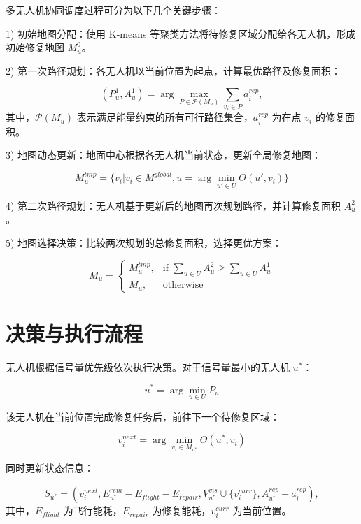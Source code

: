 \documentclass[AutoFakeBold]{LZUThesis}
\begin{document}
多无人机协同调度过程可分为以下几个关键步骤：

		1) 初始地图分配：使用 K-means 等聚类方法将待修复区域分配给各无人机，形成初始修复地图 $M_u^0$。

		2) 第一次路径规划：各无人机以当前位置为起点，计算最优路径及修复面积：

		\begin{equation}
			(P_u^1, A_u^1) = \arg\max_{P \in \mathcal{P}(M_u)} \sum_{v_i \in P} a_i^{rep},
		\end{equation}
		其中，$\mathcal{P}(M_u)$ 表示满足能量约束的所有可行路径集合，$a_i^{rep}$ 为在点 $v_i$ 的修复面积。

		3) 地图动态更新：地面中心根据各无人机当前状态，更新全局修复地图：

		\begin{equation}
			M_u^{tmp} = \{v_i | v_i \in M^{global}, u = \arg\min_{u' \in U} \Theta(u',v_i)\}
		\end{equation}

		4) 第二次路径规划：无人机基于更新后的地图再次规划路径，并计算修复面积 $A_u^2$。

		5) 地图选择决策：比较两次规划的总修复面积，选择更优方案：

\begin{equation}
	M_u =
	\begin{cases}
		M_u^{tmp}, & \text{if } \sum_{u \in U} A_u^2 \geq \sum_{u \in U} A_u^1 \\
		M_u, & \text{otherwise}
	\end{cases}
\end{equation}

\section{决策与执行流程}

无人机根据信号量优先级依次执行决策。对于信号量最小的无人机 $u^*$：

\begin{equation}
	u^* = \arg\min_{u \in U} P_u
\end{equation}

该无人机在当前位置完成修复任务后，前往下一个待修复区域：

\begin{equation}
	v_i^{next} = \arg\min_{v_i \in M_{u^*}} \Theta(u^*,v_i)
\end{equation}

同时更新状态信息：

\begin{equation}
	S_{u^*} = (v_i^{next}, E_{u^*}^{rem} - E_{flight} - E_{repair}, V_{u^*}^{vis} \cup \{v_i^{curr}\}, A_{u^*}^{rep} + a_i^{rep}),
\end{equation}
其中，$E_{flight}$ 为飞行能耗，$E_{repair}$ 为修复能耗，$v_i^{curr}$ 为当前位置。
\end{document}
